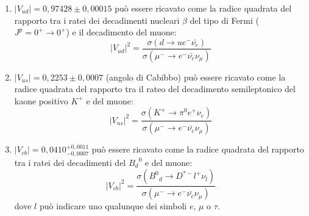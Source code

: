 \begin{enumerate}
\item $|V_{ud}| = 0,97428 \pm 0,00015$ può essere ricavato come la radice quadrata del rapporto tra i ratei dei decadimenti nucleari $\beta$ del tipo di Fermi ($J^{p} = 0^+ \rightarrow 0^+$)
 e il decadimento del muone:
\begin{equation}
 |V_{ud}|^2 = \frac{\sigma(d \rightarrow u e^- \bar{\nu_e})}{\sigma(\mu^-\rightarrow e^- \bar{\nu_e} \nu_{\mu})}
\end{equation}
\item $|V_{us}| = 0,2253 \pm 0,0007$ (angolo di Cabibbo) può essere ricavato come la radice quadrata del rapporto tra il rateo del decadimento semileptonico del kaone positivo $K^+$ e del muone:   
\begin{equation}
|V_{us}|^2 = \frac{\sigma(K^+ \rightarrow \pi^{0} e^{+} \nu_{e})}{\sigma(\mu^-\rightarrow e^- \bar{\nu_e} \nu_{\mu})}
\end{equation}
\item $|V_{cb}| = 0,0410^{+0,0011}_{-0,0007}$ può essere ricavato come la radice quadrata del rapporto tra i ratei dei decadimenti del ${B_d}^0$ e del muone:   
      \begin{equation}
       |V_{cb}|^2 = \frac{\sigma({B^0}_d \rightarrow D^{*-} l^+ \nu_l)}{\sigma(\mu^-\rightarrow e^- \bar{\nu_e} \nu_{\mu})}
      \end{equation}
      dove $l$ può indicare uno qualunque dei simboli $e$, $\mu$ o $\tau$.


\end{enumerate}
